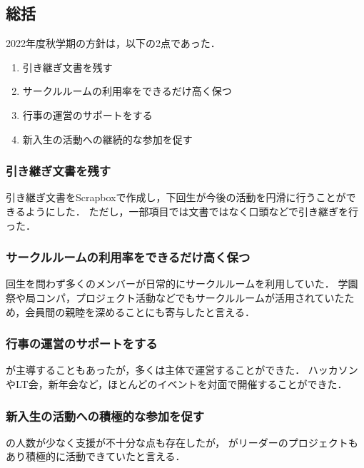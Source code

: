 \subsection*{\thirdGrade{}総括}


2022年度秋学期の\thirdGrade{}方針は，以下の2点であった．

\begin{enumerate}
    \item 引き継ぎ文書を残す
    \item サークルルームの利用率をできるだけ高く保つ
    \item 行事の運営のサポートをする
    \item 新入生の活動への継続的な参加を促す
\end{enumerate}


\subsubsection*{引き継ぎ文書を残す}
引き継ぎ文書をScrapboxで作成し，下回生が今後の活動を円滑に行うことができるようにした．
ただし，一部項目では文書ではなく口頭などで引き継ぎを行った．

\subsubsection*{サークルルームの利用率をできるだけ高く保つ}

回生を問わず多くのメンバーが日常的にサークルルームを利用していた．
学園祭や局コンパ，プロジェクト活動などでもサークルルームが活用されていたため，会員間の親睦を深めることにも寄与したと言える．

\subsubsection*{行事の運営のサポートをする}

\thirdGrade{}が主導することもあったが，多くは\secondGrade{}主体で運営することができた．
ハッカソンやLT会，新年会など，ほとんどのイベントを対面で開催することができた．

\subsubsection*{新入生の活動への積極的な参加を促す}

\secondGrade{}の人数が少なく支援が不十分な点も存在したが，
\firstGrade{}がリーダーのプロジェクトもあり積極的に活動できていたと言える．

